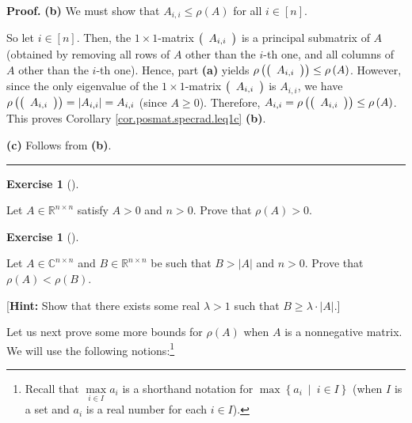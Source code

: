 \documentclass[numbers=enddot,12pt,final,onecolumn,notitlepage]{scrartcl}%
\newcounter{exer}
\numberwithin{exer}{subsection}
\theoremstyle{definition}
\newtheorem{exmp}[exer]{Exercise}
\newenvironment{exercise}[1][]
{\begin{exmp}[#1]\begin{leftbar}}
{\end{leftbar}\end{exmp}}
\newenvironment{proof}[1][Proof]{\noindent\textbf{#1.} }{\ \rule{0.5em}{0.5em}}
\begin{document}
\begin{proof}
\textbf{(b)} We must show that $A_{i,i}\leq\rho\left(  A\right)  $ for all
$i\in\left[  n\right]  $.

So let $i\in\left[  n\right]  $. Then, the $1\times1$-matrix $\left(
\begin{array}
[c]{c}%
A_{i,i}%
\end{array}
\right)  $ is a principal submatrix of $A$ (obtained by removing all rows of
$A$ other than the $i$-th one, and all columns of $A$ other than the $i$-th
one). Hence, part \textbf{(a)} yields $\rho\left(  \left(
\begin{array}
[c]{c}%
A_{i,i}%
\end{array}
\right)  \right)  \leq\rho\left(  A\right)  $. However, since the only
eigenvalue of the $1\times1$-matrix $\left(
\begin{array}
[c]{c}%
A_{i,i}%
\end{array}
\right)  $ is $A_{i,i}$, we have $\rho\left(  \left(
\begin{array}
[c]{c}%
A_{i,i}%
\end{array}
\right)  \right)  =\left\vert A_{i,i}\right\vert =A_{i,i}$ (since $A\geq0$).
Therefore, $A_{i,i}=\rho\left(  \left(
\begin{array}
[c]{c}%
A_{i,i}%
\end{array}
\right)  \right)  \leq\rho\left(  A\right)  $. This proves Corollary
\ref{cor.posmat.specrad.leq1c} \textbf{(b)}. \medskip

\textbf{(c)} Follows from \textbf{(b)}.
\end{proof}

\begin{exercise}
 Let $A\in\mathbb{R}^{n\times n}$ satisfy $A>0$ and $n>0$. Prove that
$\rho\left(  A\right)  >0$.
\end{exercise}

\begin{exercise}
 Let $A\in\mathbb{C}^{n\times n}$ and $B\in\mathbb{R}^{n\times n}$ be
such that $B>\left\vert A\right\vert $ and $n>0$. Prove that $\rho\left(
A\right)  <\rho\left(  B\right)  $. \medskip

[\textbf{Hint:} Show that there exists some real $\lambda>1$ such that
$B\geq\lambda\cdot\left\vert A\right\vert $.]
\end{exercise}

Let us next prove some more bounds for $\rho\left(  A\right)  $ when $A$ is a
nonnegative matrix. We will use the following notions:\footnote{Recall that
$\max\limits_{i\in I}a_{i}$ is a shorthand notation for $\max\left\{
a_{i}\ \mid\ i\in I\right\}  $ (when $I$ is a set and $a_{i}$ is a real number
for each $i\in I$).}
\end{document}
